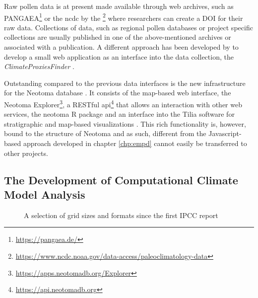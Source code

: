 \begin{refsection}
Raw pollen data is at present made available through web archives, such as PANGAEA\footnote{\url{https://pangaea.de/}} or the \gls{ncdc} by the \footnote{\url{https://www.ncdc.noaa.gov/data-access/paleoclimatology-data}} where researchers can create a DOI for their raw data. Collections of data, such as regional pollen databases or project specific collections \citep[e.g.][]{WhitmoreGajewskiSawadaEtAl2005, DavisZanonCollinsEtAl2013} are usually published in one of the above-mentioned archives or associated with a publication. A different approach has been developed by \cite{BollietBrockmannMassonDelmotteEtAl2016} to develop a small web application as an interface into the data collection, the \textit{ClimateProxiesFinder} \citep[chapter \ref{chp:empd}]{Brockmann2016}. 

Outstanding compared to the previous data interfaces is the new infrastructure for the Neotoma database \citep{WilliamsGrimmBloisEtAl2018}. It consists of the map-based web interface, the Neotoma Explorer\footnote{\url{https://apps.neotomadb.org/Explorer}}, a RESTful api\footnote{\url{https://api.neotomadb.org}} that allows an interaction with other web services, the neotoma R package \citep{GoringDawsonSimpsonEtAl2015} and an interface into the Tilia software for stratigraphic and map-based visualizations \citep{WilliamsGrimmBloisEtAl2018}. This rich functionality is, however, bound to the structure of Neotoma and as such, different from the Javascript-based approach developed in chapter \ref{chp:empd} cannot easily be transferred to other projects.


\subsection{The Development of Computational Climate Model Analysis} \label{sec:intro-software-model}

\begin{figure}
	\caption{A selection of grid sizes and formats since the first IPCC report}
	\label{fig: grid-sizes}
\end{figure}


\end{refsection}
